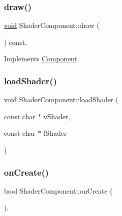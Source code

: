 \mbox{\label{classShaderComponent_a1ac6a772f197d759e9ae11fae0551687}} 
\subsubsection{\texorpdfstring{draw()}{draw()}}
{\footnotesize\ttfamily \hyperlink{imgui__impl__opengl3__loader_8h_ac668e7cffd9e2e9cfee428b9b2f34fa7}{void} Shader\+Component\+::draw (\begin{DoxyParamCaption}{ }\end{DoxyParamCaption}) const\hspace{0.3cm}{\ttfamily [inline]}, {\ttfamily [virtual]}}



Implements \hyperlink{classComponent_a8f45309003f02191f2bcc8864e8e9ecf}{Component}.

\mbox{\label{classShaderComponent_afc567dab2f49c5e161cf6e9489a5667f}} 
\subsubsection{\texorpdfstring{load\+Shader()}{loadShader()}}
{\footnotesize\ttfamily \hyperlink{imgui__impl__opengl3__loader_8h_ac668e7cffd9e2e9cfee428b9b2f34fa7}{void} Shader\+Component\+::load\+Shader (\begin{DoxyParamCaption}\item[{const char $\ast$}]{v\+Shader,  }\item[{const char $\ast$}]{f\+Shader }\end{DoxyParamCaption})}

\mbox{\label{classShaderComponent_a0c42362c7ba178050551e7451b49abe5}} 
\subsubsection{\texorpdfstring{on\+Create()}{onCreate()}}
{\footnotesize\ttfamily bool Shader\+Component\+::on\+Create (\begin{DoxyParamCaption}{ }\end{DoxyParamCaption})\hspace{0.3cm}{\ttfamily [inline]}, {\ttfamily [virtual]}}



